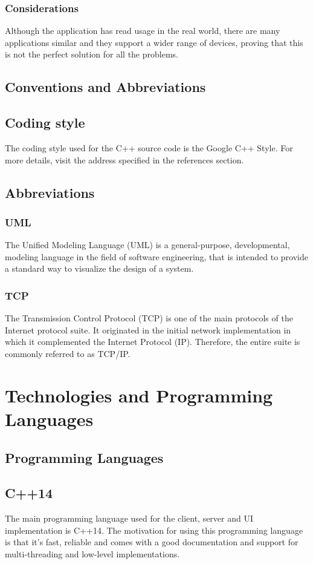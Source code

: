 \documentclass{llncs}
\begin{document}
			\subsubsection{Considerations}
				Although the application has read usage in the real world, there are many applications similar and they support a wider range of devices, proving that this is not the perfect solution for all the problems.
		\subsection{Conventions and Abbreviations}
			\subsection{Coding style}
				The coding style used for the C++ source code is the Google C++ Style. For more details, visit the address specified in the references section.
			\subsection{Abbreviations}
				\subsubsection{UML}
					The Unified Modeling Language (UML) is a general-purpose, developmental, modeling language in the field of software engineering, that is intended to provide a standard way to visualize the design of a system.
				\subsubsection{TCP}
					The Transmission Control Protocol (TCP) is one of the main protocols of the Internet protocol suite. It originated in the initial network implementation in which it complemented the Internet Protocol (IP). Therefore, the entire suite is commonly referred to as TCP/IP.
	\section{Technologies and Programming Languages}
		\subsection{Programming Languages}
			\subsection{C++14}
				The main programming language used for the client, server and UI implementation is C++14. The motivation for using this programming language is that it's fast, reliable and comes with a good documentation and support for multi-threading and low-level implementations.
\end{document}
